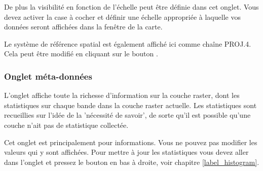De plus la visibilité en fonction de l'échelle peut être définie dans cet
onglet. Vous devez activer la case à cocher et définir une échelle appropriée à
laquelle vos données seront affichées dans la fenêtre de la carte.

Le système de référence spatial est également affiché ici comme chaîne PROJ.4.
Cela peut être modifié en cliquant sur le bouton .

\subsubsection{Onglet méta-données}\label{label_metatab}

L'onglet  affiche toute la richesse d'information sur la
couche raster, dont les statistiques sur chaque bande dans la couche raster
actuelle. Les statistiques sont recueillies sur l'idée de la 'nécessité de
savoir', de sorte qu'il est possible qu'une couche n'ait pas de
statistique collectée. 

Cet onglet est principalement pour informations. Vous ne pouvez pas modifier
les valeurs qui y sont affichées. Pour mettre à jour les statistiques vous
devez aller dans l'onglet  et pressez le bouton
 en bas à droite, voir chapitre \ref{label_histogram}.

